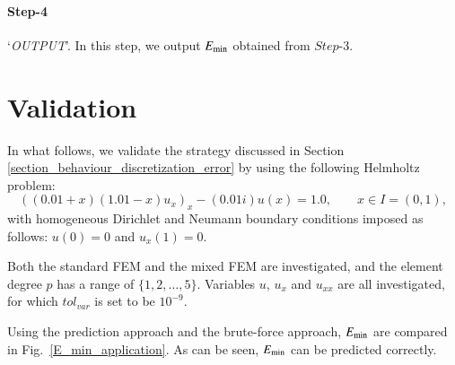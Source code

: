 \documentclass[review,3p]{elsarticle}
\begin{document}
\paragraph{Step-4} `\textit{OUTPUT}'. In this step, we output $E_{\rm min}$ obtained from $Step$-3.

\section{Validation}		\label{section_validation}

In what follows, we validate the strategy discussed in Section \ref{section_behaviour_discretization_error} by using the following Helmholtz problem:
\begin{equation}
  \left((0.01+x)(1.01-x) u_x \right)_x -(0.01i) u(x) = 1.0,\qquad x \in I = (0,1),	\label{1D_Helmholtz_equation_application}
\end{equation}
with homogeneous Dirichlet and Neumann boundary conditions imposed as follows: $u(0)=0$ and $u_x(1)=0$.

Both the standard FEM and the mixed FEM are investigated, and the element degree $p$ has a range of $\{1, 2, \ldots, 5\}$. Variables $u$, $u_x$ and $u_{xx}$ are all investigated, for which $tol_{var}$ is set to be $10^{-9}$. 

Using the prediction approach and the brute-force approach, $E_{\rm min}$ are compared in Fig.~\ref{E_min_application}. As can be seen, $E_{\rm min}$ can be predicted correctly.
\end{document}

